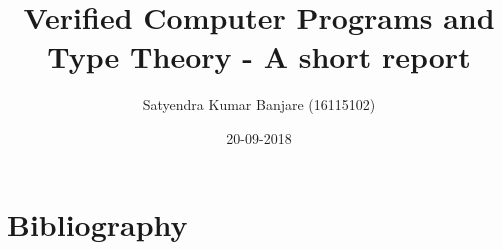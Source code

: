 \documentclass[11pt,twoside,openany]{report}
\title{Verified Computer Programs and Type Theory - A short report}
\author{Satyendra Kumar Banjare (16115102)}
\date{20-09-2018}
\begin{document}
\maketitle




\tableofcontents


















\chapter{Bibliography}
\lipsum[1]
\lipsum[0]
\end{document}

